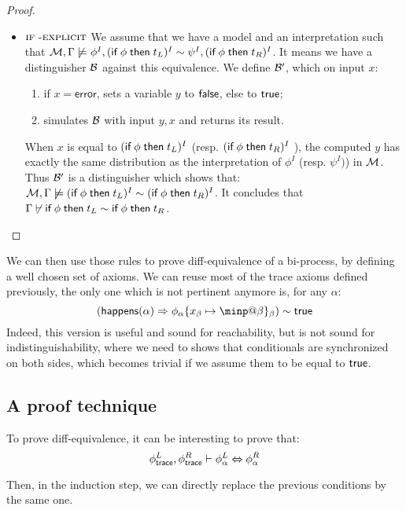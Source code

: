 \begin{proof}
  \begin{itemize}
    \item $\textsc{\textsf{if}\;-explicit}$
      We assume that we have a model and an interpretation such that
      $\mathcal{M},\Gamma \not \models  \phi^I, (\textsf{if}\;  \phi \;\textsf{then}\; t_L)^I \sim \psi^I, (\textsf{if}\; \phi \;\textsf{then}\; t_R)^I $.
      It means we have a distinguisher $\mathcal{B}$ against this equivalence.
      We define $\mathcal{B}'$, which on input $x$:
      \begin{enumerate}
      \item if $x = \mathsf{error}$, sets a variable $y$ to $\textsf{false}$, else to $\textsf{true}$;
      \item simulates $\mathcal{B}$ with input $y,x$ and returns its result.
      \end{enumerate}
      When $x$ is equal to $(\textsf{if}\; \phi \;\textsf{then}\; t_L)^I $ (resp. $(\textsf{if}\; \phi \;\textsf{then}\; t_R)^I$ ), the computed $y$ has exactly the same distribution as the interpretation of $\phi^I$ (resp. $\psi^I)$) in $\mathcal{M}$.
      Thus $\mathcal{B}'$ is a distinguisher which shows that:
    $\mathcal{M},\Gamma \not \models (\textsf{if}\;  \phi \;\textsf{then}\; t_L)^I \sim  (\textsf{if}\; \phi \;\textsf{then}\; t_R)^I $.
      It concludes that $\Gamma \not \vdash \textsf{if}\;  \phi \;\textsf{then}\; t_L \sim \textsf{if}\;  \phi \;\textsf{then}\; t_R$.

    \end{itemize}
\end{proof}


We can then use those rules to prove diff-equivalence of a bi-process, by defining a well chosen set of axioms. We can reuse most of the trace axioms defined previously, the only one which is not pertinent anymore is, for any $\alpha$:
\[   (\happens(\alpha) \Rightarrow
  \phi_\alpha\{x_\beta\mapsto\minp@\beta\}_\beta) \sim \true\]
Indeed, this version is useful and sound for reachability, but is not sound for indistinguishability, where we need to shows that conditionals are synchronized on both sides, which becomes trivial if we assume them to be equal to $\textsf{true}$.

\subsection{A proof technique}
To prove diff-equivalence, it can be interesting to prove that:
$$ \phi^L_{\textsf{trace}}, \phi^R_{\textsf{trace}} \vdash \phi^L_\alpha \Leftrightarrow \phi^R_\alpha $$

Then, in the induction step, we can directly replace the previous conditions by the same one.


